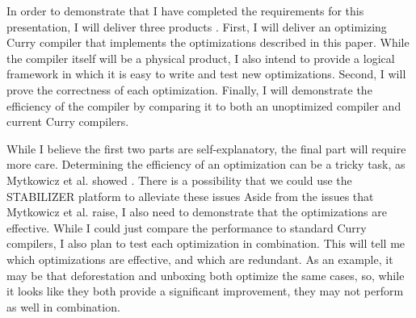 
In order to demonstrate that I have completed the requirements for this presentation, I will deliver three products .
First, I will deliver an optimizing Curry compiler that implements the optimizations described in this paper.
While the compiler itself will be a physical product, I also intend to provide a logical framework
in which it is easy to write and test new optimizations.
Second, I will prove the correctness of each optimization.
Finally, I will demonstrate the efficiency of the compiler by comparing it to both an unoptimized compiler
and current Curry compilers.

While I believe the first two parts are self-explanatory, the final part will require more care.
Determining the efficiency of an optimization can be a tricky task, as Mytkowicz et al. showed \cite{wrongData}.
There is a possibility that we could use the STABILIZER platform \cite{STABILIZER} to alleviate these issues
Aside from the issues that Mytkowicz et al. raise, I also need to demonstrate that the optimizations are effective.
While I could just compare the performance to standard Curry compilers, I also plan to test each optimization in combination.
This will tell me which optimizations are effective, and which are redundant.
As an example, it may be that deforestation and unboxing both optimize the same cases,
so, while it looks like they both provide a significant improvement, they may not perform as well in combination.


